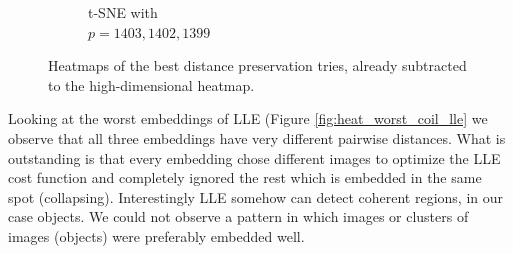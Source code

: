 \begin{figure}[!]
\begin{subfigure}[t]{0.32\columnwidth}
    	\caption{t-SNE with \\ $p=1403,1402,1399$}
        \label{fig:dist_heatmap_tsne_coil20_1-3best}
    \end{subfigure}
     \caption[Heatmaps of Best Distance Preservations]{Heatmaps of the best distance preservation tries, already subtracted to the high-dimensional heatmap.}
    \label{fig:heat_best}
\end{figure}

Looking at the worst embeddings of LLE (Figure \ref{fig:heat_worst_coil_lle} we observe that all three embeddings have very different pairwise distances. What is outstanding is that every embedding chose different images to optimize the LLE cost function and completely ignored the rest which is embedded in the same spot (collapsing). Interestingly LLE somehow can detect coherent regions, in our case objects. We could not observe a pattern in which images or clusters of images (objects) were preferably embedded well.

